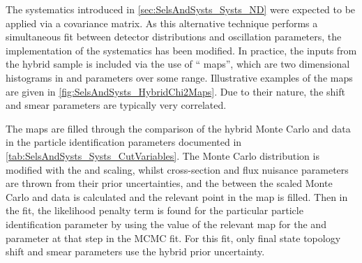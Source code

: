The  systematics introduced in \autoref{sec:SelsAndSysts_Systs_ND} were expected to be applied via a covariance matrix. As this alternative technique performs a simultaneous fit between detector distributions and oscillation parameters, the implementation of the  systematics has been modified. In practice, the inputs from the hybrid  sample is included via the use of `` maps'', which are two dimensional histograms in \quickmath{\alpha} and \quickmath{\beta} parameters over some range. Illustrative examples of the  maps are given in \autoref{fig:SelsAndSysts_HybridChi2Maps}. Due to their nature, the shift and smear parameters are typically very correlated.

The maps are filled through the  comparison of the hybrid  Monte Carlo and data in the particle identification parameters documented in \autoref{tab:SelsAndSysts_Systs_CutVariables}. The Monte Carlo distribution is modified with the \quickmath{\alpha} and \quickmath{\beta} scaling, whilst cross-section and flux nuisance parameters are thrown from their prior uncertainties, and the  between the scaled Monte Carlo and data is calculated and the relevant point in the  map is filled. Then in the fit, the likelihood penalty term is found for the particular particle identification parameter by using the value of the relevant  map for the \quickmath{\alpha} and \quickmath{\beta} parameter at that step in the MCMC fit. For this fit, only  final state topology shift and smear parameters use the hybrid   prior uncertainty. 

